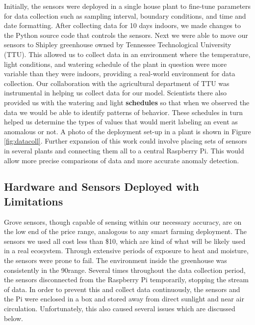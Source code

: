 Initially, the sensors were deployed in a single house plant to fine-tune parameters for data collection such as sampling interval, boundary conditions, and time and date formatting. After collecting data for 10 days indoors, we made changes to the Python source code that controls the sensors. Next we were able to move our sensors to Shipley greenhouse owned by Tennessee Technological University (TTU). This allowed us to collect data in an environment where the temperature, light conditions, and watering schedule of the plant in question were more variable than they were indoors, providing a real-world environment for data collection. Our collaboration with the agricultural department of TTU was instrumental in helping us collect data for our model. Scientists there also provided us with the watering and light \textbf{schedules} so that when we observed the data we would be able to identify patterns of behavior. These schedules in turn helped us determine the types of values that would merit labeling an event as anomalous or not. A photo of the deployment set-up in a plant is shown in Figure \ref{fig:datacoll}. Further expansion of this work could involve placing sets of sensors in several plants and connecting them all to a central Raspberry Pi. This would allow more precise comparisons of data and more accurate anomaly detection.



\subsection{Hardware and Sensors Deployed with Limitations}
Grove sensors, though capable of sensing within our necessary accuracy, are on the low end of the price range, analogous to any smart farming deployment. The sensors we used all cost less than \$10, which are kind of what will be likely used in a real ecosystem. Through extensive periods of exposure to heat and moisture, the sensors were prone to fail. The environment inside the greenhouse was consistently in the 90\degree range. Several times throughout the data collection period, the sensors disconnected from the Raspberry Pi temporarily, stopping the stream of data. In order to prevent this and collect data continuously, the sensors and the Pi were enclosed in a box and stored away from direct sunlight and near air circulation. Unfortunately, this also caused several issues which are discussed below.

